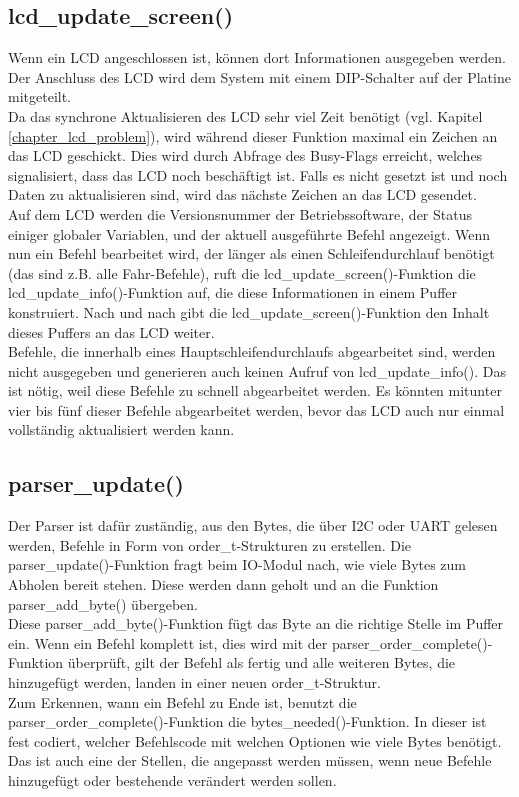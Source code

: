 \subsection{lcd\_update\_screen()}
Wenn ein LCD angeschlossen ist, können dort Informationen ausgegeben werden.
Der Anschluss des LCD wird dem System mit einem DIP-Schalter auf der Platine mitgeteilt.\\
Da das synchrone Aktualisieren des LCD sehr viel Zeit benötigt (vgl. Kapitel \ref{chapter_lcd_problem}), wird
während dieser Funktion maximal ein Zeichen an das LCD geschickt.
Dies wird durch Abfrage des Busy-Flags erreicht, welches signalisiert, dass das LCD noch
beschäftigt ist. Falls es nicht gesetzt ist und noch Daten zu aktualisieren sind,
wird das nächste Zeichen an das LCD gesendet.\\
Auf dem LCD werden die Versionsnummer der Betriebssoftware, der Status einiger globaler Variablen, und
der aktuell ausgeführte Befehl angezeigt. Wenn nun ein Befehl bearbeitet wird, der länger als einen
Schleifendurchlauf benötigt (das sind z.B. alle Fahr-Befehle), ruft die lcd\_\-update\_\-screen()-Funktion
die lcd\_\-update\_\-info()-Funktion auf, die diese Informationen in einem Puffer konstruiert. Nach und nach
gibt die lcd\_\-update\_\-screen()-Funktion den Inhalt dieses Puffers an das LCD weiter.\\
Befehle, die innerhalb eines Hauptschleifendurchlaufs abgearbeitet sind, werden nicht ausgegeben und
generieren auch keinen Aufruf von lcd\_\-update\_\-info(). Das ist nötig, weil diese Befehle zu schnell abgearbeitet
werden. Es könnten mitunter vier bis fünf dieser Befehle abgearbeitet werden, bevor das LCD auch nur einmal vollständig
aktualisiert werden kann.

\subsection{parser\_update()}
Der Parser ist dafür zuständig, aus den Bytes, die über I2C oder UART gelesen werden, Befehle in Form von
order\_t-Strukturen zu erstellen. Die parser\_\-update()-Funktion fragt beim IO-Modul nach, wie viele Bytes
zum Abholen bereit stehen. Diese werden dann geholt und an die Funktion parser\_\-add\_\-byte() übergeben.\\
Diese parser\_\-add\_\-byte()-Funktion fügt das Byte an die richtige Stelle im Puffer ein. Wenn ein Befehl
komplett ist, dies wird mit der parser\_\-order\_\-complete()-Funktion überprüft, gilt der Befehl als fertig und
alle weiteren Bytes, die hinzugefügt werden, landen in einer neuen order\_t-Struktur.\\
Zum Erkennen, wann ein Befehl zu Ende ist, benutzt die parser\_\-order\_\-complete()-Funktion
die bytes\_\-needed()-Funktion. In dieser ist fest codiert, welcher Befehlscode mit welchen Optionen wie viele
Bytes benötigt. Das ist auch eine der Stellen, die angepasst werden müssen, wenn neue Befehle hinzugefügt
oder bestehende verändert werden sollen.

